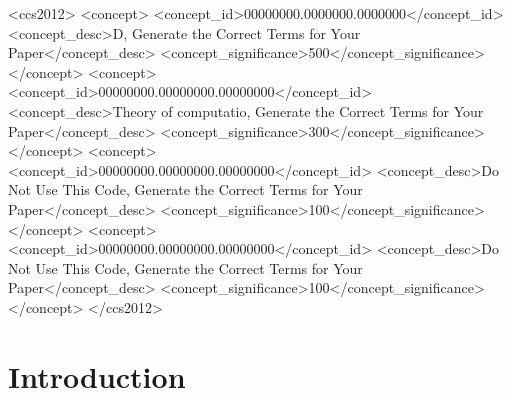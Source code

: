 \documentclass[sigconf]{acmart}
\begin{document}
\begin{CCSXML}
<ccs2012>
 <concept>
  <concept_id>00000000.0000000.0000000</concept_id>
  <concept_desc>D, Generate the Correct Terms for Your Paper</concept_desc>
  <concept_significance>500</concept_significance>
 </concept>
 <concept>
  <concept_id>00000000.00000000.00000000</concept_id>
  <concept_desc>Theory of computatio, Generate the Correct Terms for Your Paper</concept_desc>
  <concept_significance>300</concept_significance>
 </concept>
 <concept>
  <concept_id>00000000.00000000.00000000</concept_id>
  <concept_desc>Do Not Use This Code, Generate the Correct Terms for Your Paper</concept_desc>
  <concept_significance>100</concept_significance>
 </concept>
 <concept>
  <concept_id>00000000.00000000.00000000</concept_id>
  <concept_desc>Do Not Use This Code, Generate the Correct Terms for Your Paper</concept_desc>
  <concept_significance>100</concept_significance>
 </concept>
</ccs2012>
\end{CCSXML}







\maketitle

\section{Introduction}
\end{document}
